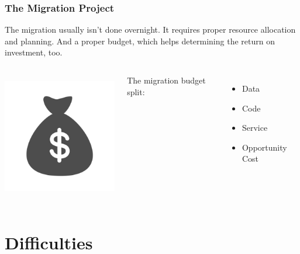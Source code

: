 \documentclass{beamer}
\begin{document}
\begin{frame}[fragile]
  \frametitle{The Migration Project}

  The migration usually isn't done overnight. It requires proper resource
  allocation and planning. And a proper budget, which helps determining the
  return on investment, too.

  \vfill
  
  \begin{columns}[c]
    \begin{center}
      \includegraphics[height=15em]{budget.png}
    \end{center}

    The migration budget split:
    \begin{itemize}
    \item Data
    \item Code
    \item Service
    \item Opportunity Cost
    \end{itemize}
  \end{columns}
\end{frame}

\section{Difficulties}
\end{document}
